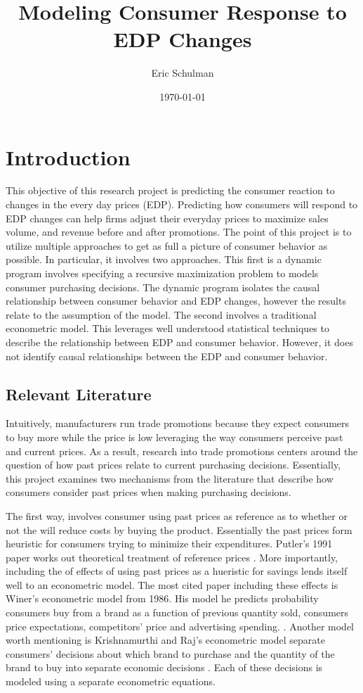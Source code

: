 \documentclass{article}
\title{Modeling Consumer Response to EDP Changes}
\author{Eric Schulman}
\date{\today}
\begin{document}
\maketitle

\section{Introduction}

This objective of this research project is predicting the consumer reaction to changes in the every day prices (EDP). Predicting how consumers will respond to EDP changes can help firms adjust their everyday prices to maximize sales volume, and revenue before and after promotions. The point of this project is to utilize multiple approaches to get as full a picture of consumer behavior as possible. In particular, it involves two approaches. This first is a dynamic program involves specifying  a recursive maximization problem to models consumer purchasing decisions. The dynamic program isolates the causal relationship between consumer behavior and EDP changes, however the results relate to the assumption of the model. The second involves a traditional econometric model. This leverages well understood statistical techniques to describe the relationship between EDP and consumer behavior. However, it does not identify causal relationships between the EDP and consumer behavior.

\subsection{Relevant Literature}

Intuitively, manufacturers run trade promotions because they expect consumers to buy more while the price is low leveraging the way consumers perceive past and current prices. As a result, research into trade promotions centers around the question of how past prices relate to current purchasing decisions. Essentially, this project examines two mechanisms from the literature that describe how consumers consider past prices when making purchasing decisions.

The first way, involves consumer using past prices as reference as to whether or not the will reduce costs by buying the product. Essentially the past prices form heuristic for consumers trying to minimize their expenditures. Putler's 1991 paper works out theoretical treatment of reference prices \cite{putler}. More importantly, including the of effects of using past prices as a hueristic for savings lends itself well to an econometric model. The most cited paper including these effects is Winer's econometric model from 1986. His model he predicts probability consumers buy from a brand as a function of previous quantity sold, consumers price expectations, competitors' price and advertising spending.  \cite{winer}. Another model worth mentioning is Krishnamurthi and Raj's econometric model separate consumers' decisions about which brand to purchase and the quantity of the brand to buy into separate economic decisions \cite{krishnamurthi}. Each of these decisions is modeled using a separate econometric equations. 
\end{document}
